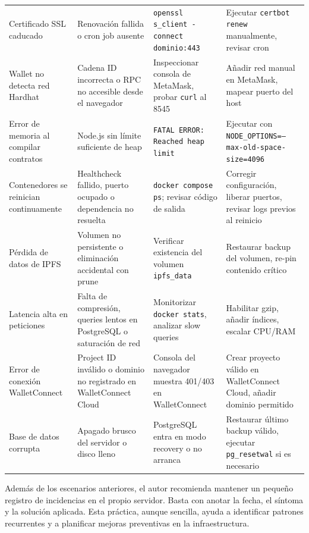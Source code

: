 \documentclass[11pt, a4paper]{article}
\begin{document}
\begin{longtable}{@{}p{3.5cm}p{3.5cm}p{4cm}p{3.5cm}@{}}
Certificado SSL caducado & Renovaci\'{o}n fallida o cron job ausente & \texttt{openssl s\_client -connect dominio:443} & Ejecutar \texttt{certbot renew} manualmente, revisar cron \\
Wallet no detecta red Hardhat & Cadena ID incorrecta o RPC no accesible desde el navegador & Inspeccionar consola de MetaMask, probar \texttt{curl} al 8545 & A\~{n}adir red manual en MetaMask, mapear puerto del host \\
Error de memoria al compilar contratos & Node.js sin l\'{i}mite suficiente de heap & \texttt{FATAL ERROR: Reached heap limit} & Ejecutar con \texttt{NODE\_OPTIONS=--max-old-space-size=4096} \\
Contenedores se reinician continuamente & Healthcheck fallido, puerto ocupado o dependencia no resuelta & \texttt{docker compose ps}; revisar c\'{o}digo de salida & Corregir configuraci\'{o}n, liberar puertos, revisar logs previos al reinicio \\
P\'{e}rdida de datos de IPFS & Volumen no persistente o eliminaci\'{o}n accidental con prune & Verificar existencia del volumen \texttt{ipfs\_data} & Restaurar backup del volumen, re-pin contenido cr\'{i}tico \\
Latencia alta en peticiones & Falta de compresi\'{o}n, queries lentos en PostgreSQL o saturaci\'{o}n de red & Monitorizar \texttt{docker stats}, analizar slow queries & Habilitar gzip, a\~{n}adir \'{i}ndices, escalar CPU/RAM \\
Error de conexi\'{o}n WalletConnect & Project ID inv\'{a}lido o dominio no registrado en WalletConnect Cloud & Consola del navegador muestra 401/403 en WalletConnect & Crear proyecto v\'{a}lido en WalletConnect Cloud, a\~{n}adir dominio permitido \\
Base de datos corrupta & Apagado brusco del servidor o disco lleno & PostgreSQL entra en modo recovery o no arranca & Restaurar \'{u}ltimo backup v\'{a}lido, ejecutar \texttt{pg\_resetwal} si es necesario \\
\end{longtable}
\label{tab:incidencias}

\vspace{0.5cm}
\noindent Adem\'as de los escenarios anteriores, el autor recomienda mantener un peque\~{n}o registro de incidencias en el propio servidor. Basta con anotar la fecha, el s\'intoma y la soluci\'on aplicada. Esta pr\'actica, aunque sencilla, ayuda a identificar patrones recurrentes y a planificar mejoras preventivas en la infraestructura.
\end{document}
